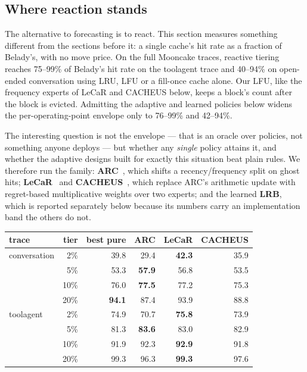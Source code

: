 \subsection{Where reaction stands}
\label{sec:reaction}
The alternative to forecasting is to react. This section measures something different from the sections
before it: a single cache's hit rate as a fraction of Belady's, with no move price. On the full Mooncake
traces, reactive tiering reaches 75--99\% of Belady's hit rate on the toolagent trace and 40--94\% on
open-ended conversation using LRU, LFU or a fill-once cache alone. Our LFU, like the frequency experts of
LeCaR and CACHEUS below, keeps a block's count after the block is evicted. Admitting the adaptive and learned
policies below widens the per-operating-point envelope only to 76--99\% and 42--94\%.

The interesting question is not the envelope --- that is an oracle over policies, not something anyone
deploys --- but whether any \emph{single} policy attains it, and whether the adaptive designs built for
exactly this situation beat plain rules. We therefore run the family: \textbf{ARC}~\cite{S7_megiddo2003arc},
which shifts a recency/frequency split on ghost hits; \textbf{LeCaR}~\cite{S8_vietri2018lecar} and
\textbf{CACHEUS}~\cite{S9_rodriguez2021cacheus}, which replace ARC's arithmetic update with regret-based
multiplicative weights over two experts; and the learned \textbf{LRB}, which is reported separately below because its
numbers carry an implementation band the others do not.

\begin{center}\small
\begin{tabular}{@{}lrrrrr@{}}
\toprule
trace & tier & best pure & ARC & LeCaR & CACHEUS \\
\midrule
conversation & 2\%  & 39.8 & 29.4 & \textbf{42.3} & 35.9 \\
             & 5\%  & 53.3 & \textbf{57.9} & 56.8 & 53.5 \\
             & 10\% & 76.0 & \textbf{77.5} & 77.2 & 75.3 \\
             & 20\% & \textbf{94.1} & 87.4 & 93.9 & 88.8 \\
\midrule
toolagent    & 2\%  & 74.9 & 70.7 & \textbf{75.8} & 73.9 \\
             & 5\%  & 81.3 & \textbf{83.6} & 83.0 & 82.9 \\
             & 10\% & 91.9 & 92.3 & \textbf{92.9} & 91.8 \\
             & 20\% & 99.3 & 96.3 & \textbf{99.3} & 97.6 \\
\bottomrule
\end{tabular}
\end{center}

